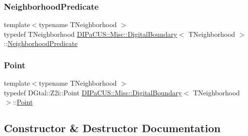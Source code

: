 \subsubsection{\texorpdfstring{Neighborhood\+Predicate}{NeighborhoodPredicate}}
{\footnotesize\ttfamily template$<$typename T\+Neighborhood $>$ \\
typedef T\+Neighborhood \mbox{\hyperlink{structDIPaCUS_1_1Misc_1_1DigitalBoundary}{D\+I\+Pa\+C\+U\+S\+::\+Misc\+::\+Digital\+Boundary}}$<$ T\+Neighborhood $>$\+::\mbox{\hyperlink{structDIPaCUS_1_1Misc_1_1DigitalBoundary_a66b2b672db2006130bd100902d4d8684}{Neighborhood\+Predicate}}}

\mbox{\label{structDIPaCUS_1_1Misc_1_1DigitalBoundary_a4434320a7be995d954820b08574eb33c}} 
\subsubsection{\texorpdfstring{Point}{Point}}
{\footnotesize\ttfamily template$<$typename T\+Neighborhood $>$ \\
typedef D\+Gtal\+::\+Z2i\+::\+Point \mbox{\hyperlink{structDIPaCUS_1_1Misc_1_1DigitalBoundary}{D\+I\+Pa\+C\+U\+S\+::\+Misc\+::\+Digital\+Boundary}}$<$ T\+Neighborhood $>$\+::\mbox{\hyperlink{structDIPaCUS_1_1Misc_1_1DigitalBoundary_a4434320a7be995d954820b08574eb33c}{Point}}}



\subsection{Constructor \& Destructor Documentation}
\mbox{\label{structDIPaCUS_1_1Misc_1_1DigitalBoundary_ae47f8d48551d3ac4a9b7e3bbf305732b}} 
